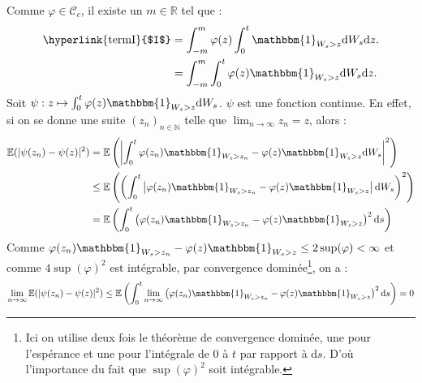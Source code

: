 \documentclass[openany]{book}
\makeatletter
\newcommand{\R}{\mathbb{R}}
\newcommand{\E}{\mathbb{E}}
\newcommand{\1}{\mathbbm{1}}
\renewcommand{\d}{\mathrm{d}}
\renewenvironment{proof}[1][\textbf{\textit{Démonstration}}]{%
  \par\pushQED{\qed}%
  \normalfont\topsep6\p@\@plus6\p@\relax
  \trivlist\item[\hskip\labelsep
    #1\@addpunct{.}]\ignorespaces
}{%
  \popQED\endtrivlist\@endpefalse
}
\theoremstyle{thmfont}
\theoremstyle{deffont}
\theoremstyle{thmfont}
\theoremstyle{deffont}
\makeatother
\begin{document}
\begin{proof}
  \noindent Comme $\varphi \in \mathcal C_c$, il existe un $m \in \R$ tel que :
  \begin{align*}
    \text{\hyperlink{termI}{$I$}} &= \int_{-m}^m \varphi(z) \int_0^t \1_{W_s>z} \d W_s \d z.\\
                                  &= \int_{-m}^m  \int_0^t  \varphi(z) \1_{W_s>z} \d W_s \d z.
  \end{align*}
  Soit $\psi : z \mapsto \int_0^t \varphi(z) \1_{W_s>z} \d W_s$. $\psi$ est une fonction continue. En effet, si on se donne une suite $(z_n)_{n \in \mathbb N}$ telle que $\lim_{n \to \infty} z_n = z$, alors :
  \begin{align*}\E(|\psi(z_n) - \psi(z)|^2) &= \E\left(\left|\int_0^t \varphi(z_n)\1_{W_s > z_n} - \varphi(z)\1_{W_s >z} \d W_s\right|^2\right)\\
    &\leq \E\left(\left(\int_0^t\left| \varphi(z_n)\1_{W_s > z_n} - \varphi(z)\1_{W_s >z} \right|\d W_s\right)^2\right)\\
    &= \E\left(\int_0^t\left( \varphi(z_n)\1_{W_s > z_n} - \varphi(z)\1_{W_s >z}\right)^2 \d s \right)
  \end{align*}
   Comme $\varphi(z_n)\1_{W_s > z_n} - \varphi(z)\1_{W_s >z} \leq 2 \sup(\varphi) < \infty$ et comme $4 \sup(\varphi)^2$ est intégrable, par convergence dominée\footnote{Ici on utilise deux fois le théorème de convergence dominée, une pour l'espérance et une pour l'intégrale de $0$ à $t$ par rapport à $\d s$. D'où l'importance du fait que $\sup(\varphi)^2$ soit intégrable.}, on a :
$$\lim_{n \to \infty} \E(|\psi(z_n) - \psi(z)|^2) \leq \E\left(\int_0^t\lim_{n \to \infty}\left( \varphi(z_n)\1_{W_s > z_n} - \varphi(z)\1_{W_s >z}\right)^2 \d s \right) = 0$$


\end{proof}
\end{document}
